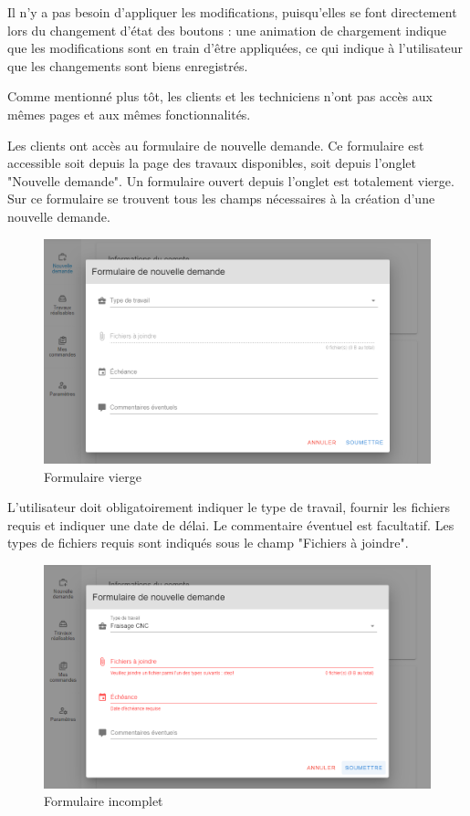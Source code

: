 \documentclass[
    iai, %
    eai, %
]{heig-tb}
\begin{document}
Il n'y a pas besoin d'appliquer les modifications, puisqu'elles se font directement lors du changement d'état des boutons : une animation de chargement indique que les modifications sont en train d'être appliquées, ce qui indique à l'utilisateur que les changements sont biens enregistrés.

\newpage
Comme mentionné plus tôt, les clients et les techniciens n'ont pas accès aux mêmes pages et aux mêmes fonctionnalités.

Les clients ont accès au formulaire de nouvelle demande. Ce formulaire est accessible soit depuis la page des travaux disponibles, soit depuis l'onglet "Nouvelle demande".
Un formulaire ouvert depuis l'onglet est totalement vierge. Sur ce formulaire se trouvent tous les champs nécessaires à la création d'une nouvelle demande.

\begin{figure}[h]
  \includegraphics[width=14cm]{ui_submit1.PNG}
  \caption{Formulaire vierge}
\end{figure}

L'utilisateur doit obligatoirement indiquer le type de travail, fournir les fichiers requis et indiquer une date de délai. Le commentaire éventuel est facultatif.
Les types de fichiers requis sont indiqués sous le champ "Fichiers à joindre".

\begin{figure}[h]
  \includegraphics[width=14cm]{ui_submit2.PNG}
  \caption{Formulaire incomplet}
\end{figure}
\end{document}
